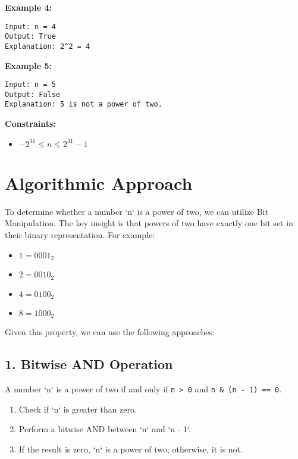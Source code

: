 \textbf{Example 4:}

\begin{verbatim}
Input: n = 4
Output: True
Explanation: 2^2 = 4
\end{verbatim}

\textbf{Example 5:}

\begin{verbatim}
Input: n = 5
Output: False
Explanation: 5 is not a power of two.
\end{verbatim}

\textbf{Constraints:}

\begin{itemize}
    \item \(-2^{31} \leq n \leq 2^{31} - 1\)
\end{itemize}


\section*{Algorithmic Approach}

To determine whether a number `n` is a power of two, we can utilize Bit Manipulation. The key insight is that powers of two have exactly one bit set in their binary representation. For example:

\begin{itemize}
    \item \(1 = 0001_2\)
    \item \(2 = 0010_2\)
    \item \(4 = 0100_2\)
    \item \(8 = 1000_2\)
\end{itemize}

Given this property, we can use the following approaches:

\subsection*{1. Bitwise AND Operation}

A number `n` is a power of two if and only if \texttt{n > 0} and \texttt{n \& (n - 1) == 0}.

\begin{enumerate}
    \item Check if `n` is greater than zero.
    \item Perform a bitwise AND between `n` and `n - 1`.
    \item If the result is zero, `n` is a power of two; otherwise, it is not.
\end{enumerate}

